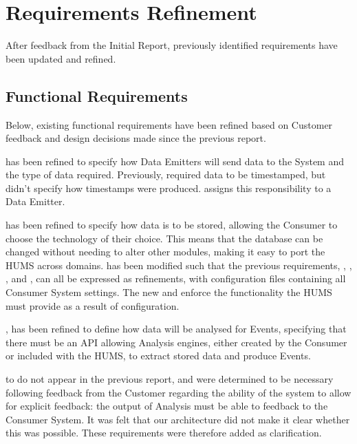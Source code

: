 \section{Requirements Refinement}
\label{sec:requirements}
After feedback from the Initial Report, previously identified requirements have been updated and refined.

\subsection{Functional Requirements}
\label{sec:requirements-functional}
Below, existing functional requirements have been refined based on Customer feedback and design decisions made since the previous report.

 has been refined to specify how Data Emitters will send data to the System and the type of data required. Previously,  required data to be timestamped, but didn't specify how timestamps were produced.  assigns this responsibility to a Data Emitter.

 has been refined to specify how data is to be stored, allowing the Consumer to choose the technology of their choice. This means that the database can be changed without needing to alter other modules, making it easy to port the HUMS across domains.
 has been modified such that the previous requirements, , , , and , can all be expressed as refinements, with 
configuration files containing all Consumer System settings. The new  and  enforce the functionality the HUMS must provide as a result of configuration.

, has been refined to define how data will be analysed for Events, specifying that there must be an API allowing Analysis engines, either created by the Consumer or included with the HUMS, to extract stored data
and produce Events. 

 to  do not appear in the previous report, and were determined 
to be necessary following feedback from the Customer regarding the ability 
of the system to allow for explicit feedback: the output of Analysis must be able to feedback to the Consumer System. It was felt that our architecture did not make it clear whether this was possible. These requirements were therefore added as clarification.


